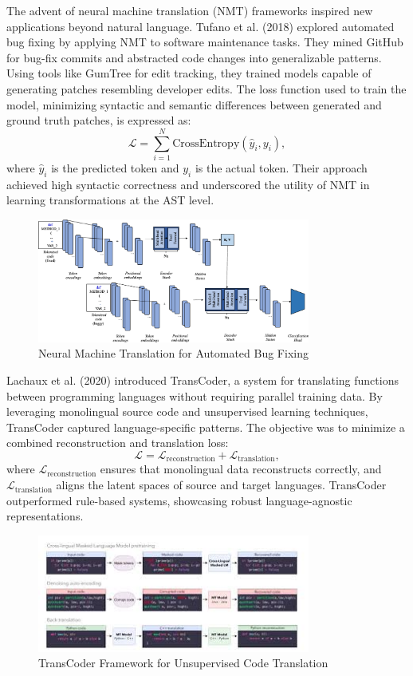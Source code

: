 \documentclass{dhbenelux}
\begin{document}
The advent of neural machine translation (NMT) frameworks inspired new applications beyond natural language. Tufano et al. (2018) explored automated bug fixing by applying NMT to software maintenance tasks. They mined GitHub for bug-fix commits and abstracted code changes into generalizable patterns. Using tools like GumTree for edit tracking, they trained models capable of generating patches resembling developer edits. The loss function used to train the model, minimizing syntactic and semantic differences between generated and ground truth patches, is expressed as:
\[
\mathcal{L} = \sum_{i=1}^N \text{CrossEntropy}(\hat{y}_i, y_i),
\]
where \( \hat{y}_i \) is the predicted token and \( y_i \) is the actual token. Their approach achieved high syntactic correctness and underscored the utility of NMT in learning transformations at the AST level.

\begin{figure}[h]
    \centering
    \includegraphics[width=0.8\textwidth]{Images/3.png} %
    \caption{Neural Machine Translation for Automated Bug Fixing}
    \label{fig:nmt-bug-fixing}
\end{figure}

Lachaux et al. (2020) introduced TransCoder, a system for translating functions between programming languages without requiring parallel training data. By leveraging monolingual source code and unsupervised learning techniques, TransCoder captured language-specific patterns. The objective was to minimize a combined reconstruction and translation loss:
\[
\mathcal{L} = \mathcal{L}_{\text{reconstruction}} + \mathcal{L}_{\text{translation}},
\]
where \( \mathcal{L}_{\text{reconstruction}} \) ensures that monolingual data reconstructs correctly, and \( \mathcal{L}_{\text{translation}} \) aligns the latent spaces of source and target languages. TransCoder outperformed rule-based systems, showcasing robust language-agnostic representations.

\begin{figure}[h]
    \centering
    \includegraphics[width=0.8\textwidth]{Images/4.jpg}
    \caption{TransCoder Framework for Unsupervised Code Translation}
    \label{fig:transcoder}
\end{figure}
\end{document}
